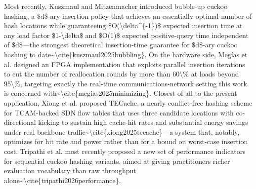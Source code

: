 \documentclass[conference]{IEEEtran}
\begin{document}
Most recently, Kuszmaul and Mitzenmacher introduced bubble-up cuckoo hashing, a \$d\$-ary insertion policy that achieves an essentially optimal number of hash locations while guaranteeing \$O(\textbackslash{}delta\^{}\{-1\})\$ expected insertion time at any load factor \$1-\textbackslash{}delta\$ and \$O(1)\$ expected positive-query time independent of \$d\$---the strongest theoretical insertion-time guarantee for \$d\$-ary cuckoo hashing to date\~{}\textbackslash{}cite\{kuszmaul2025bubbling\}. On the hardware side, Megías et al. designed an FPGA implementation that exploits parallel insertion iterations to cut the number of reallocation rounds by more than 60\textbackslash{}\% at loads beyond 95\textbackslash{}\%, targeting exactly the real-time communications-network setting this work is concerned with\~{}\textbackslash{}cite\{megias2025minimizing\}. Closest of all to the present application, Xiong et al. proposed TECache, a nearly conflict-free hashing scheme for TCAM-backed SDN flow tables that uses three candidate locations with co-directional kicking to sustain high cache-hit rates and substantial energy savings under real backbone traffic\~{}\textbackslash{}cite\{xiong2025tecache\}---a system that, notably, optimizes for hit rate and power rather than for a bound on worst-case insertion cost. Tripathi et al. most recently proposed a new set of performance indicators for sequential cuckoo hashing variants, aimed at giving practitioners richer evaluation vocabulary than raw throughput alone\~{}\textbackslash{}cite\{tripathi2026performance\}.
\end{document}
